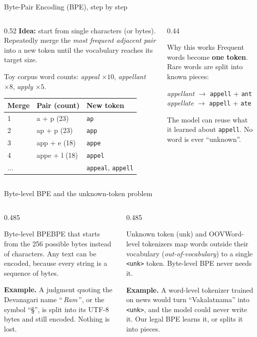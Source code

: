\documentclass[aspectratio=169,11pt]{beamer}
\newcommand{\code}[1]{\texttt{\small #1}}
\newcommand{\term}[3]{%
  \begin{block}{#1}\small #2\par\vspace{1mm}%
  {\color{exgreen}\textbf{Example.}} #3\end{block}}
\newcommand{\twoterms}[6]{%
  \begin{columns}[T]
    \begin{column}{0.485\textwidth}\term{#1}{#2}{#3}\end{column}
    \begin{column}{0.485\textwidth}\term{#4}{#5}{#6}\end{column}
  \end{columns}}
\begin{document}
\begin{frame}{Byte-Pair Encoding (BPE), step by step}
  \begin{columns}[T]
    \begin{column}{0.52\textwidth}
      \small
      \textbf{Idea:} start from single characters (or bytes). Repeatedly merge the \emph{most frequent adjacent pair} into a new token until the vocabulary reaches its target size.
      \vspace{2mm}

      Toy corpus word counts: \emph{appeal} $\times10$, \emph{appellant} $\times8$, \emph{apply} $\times5$.
      \vspace{1mm}

      \begin{tabular}{@{}lll@{}}
        \toprule
        Merge & Pair (count) & New token\\
        \midrule
        1 & a + p (23) & \code{ap}\\
        2 & ap + p (23) & \code{app}\\
        3 & app + e (18) & \code{appe}\\
        4 & appe + l (18) & \code{appel}\\
        $\ldots$ & & \code{appeal}, \code{appell}\\
        \bottomrule
      \end{tabular}
    \end{column}
    \begin{column}{0.44\textwidth}
      \begin{exampleblock}{Why this works}
        \small
        Frequent words become \textbf{one token}. Rare words are split into known pieces:
        \vspace{1mm}

        \emph{appellant} $\to$ \code{appell} + \code{ant}\\
        \emph{appellate} $\to$ \code{appell} + \code{ate}
        \vspace{1mm}

        The model can reuse what it learned about \code{appell}. No word is ever ``unknown''.
      \end{exampleblock}
    \end{column}
  \end{columns}
\end{frame}

\begin{frame}{Byte-level BPE and the unknown-token problem}
  \twoterms{Byte-level BPE}
  {BPE that starts from the 256 possible bytes instead of characters. Any text can be encoded, because every string is a sequence of bytes.}
  {A judgment quoting the Devanagari name ``\,\textit{Ram}\,'', or the symbol ``\S'', is split into its UTF-8 bytes and still encoded. Nothing is lost.}
  {Unknown token (unk) and OOV}
  {Word-level tokenizers map words outside their vocabulary (\emph{out-of-vocabulary}) to a single \code{<unk>} token. Byte-level BPE never needs it.}
  {A word-level tokenizer trained on news would turn ``Vakalatnama'' into \code{<unk>}, and the model could never write it. Our legal BPE learns it, or splits it into pieces.}
\end{frame}
\end{document}
